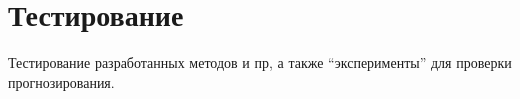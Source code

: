 \newpage
\section{Тестирование}
\label{sec:Testings}

Тестирование разработанных методов и пр, а также “эксперименты” для проверки прогнозирования.